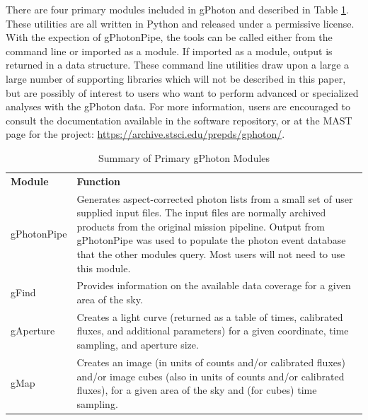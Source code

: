 \documentclass[5p]{elsarticle}
\begin{document}
There are four primary modules included in gPhoton and described in Table \ref{moduledesc}. These utilities are all written in Python and released under a permissive license. With the expection of gPhotonPipe, the tools can be called either from the command line or imported as a module. If imported as a module, output is returned in a data structure. These command line utilities draw upon a large a large number of supporting libraries which will not be described in this paper, but are possibly of interest to users who want to perform advanced or specialized analyses with the gPhoton data.  For more information, users are encouraged to consult the documentation available in the software repository, or at the MAST page for the project: \url{https://archive.stsci.edu/prepds/gphoton/}.

\begin{table}
\begin{tabular}{|p{2cm}|p{6cm}|}
\hline
	{\bf Module} & {\bf Function}\\
	gPhotonPipe & Generates aspect-corrected photon lists from a small set of user supplied input files.  The input files are normally archived products from the original mission pipeline. Output from gPhotonPipe was used to populate the photon event database that the other modules query.  Most users will not need to use this module.\\\hline
	gFind & Provides information on the available data coverage for a given area of the sky.\\\hline
	gAperture & Creates a light curve (returned as a table of times, calibrated fluxes, and additional parameters) for a given coordinate, time sampling, and aperture size.\\\hline
	gMap & Creates an image (in units of counts and/or calibrated fluxes) and/or image cubes (also in units of counts and/or calibrated fluxes), for a given area of the sky and (for cubes) time sampling.\\
\hline
\end{tabular}
\caption{Summary of Primary gPhoton Modules}
\label{moduledesc}
\end{table}
\end{document}
